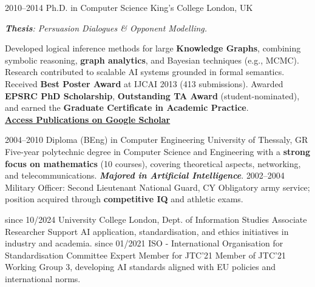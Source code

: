 \documentclass[]{../../friggeri-cv}
\begin{document}
\newpage
{}
\begin{entrylist2}
	\entrytwo
	    {\small 2010–2014}
	    {\small Ph.D. in Computer Science}
    	{\small King’s College London, UK}
	    {\small \emph{\textbf{Thesis}: Persuasion Dialogues \& Opponent Modelling.}
	    
	    	{\footnotesize Developed logical inference methods for large \textbf{Knowledge Graphs}, combining symbolic reasoning, \textbf{graph analytics}, and Bayesian techniques (e.g., MCMC). Research contributed to scalable AI systems grounded in formal semantics. Received \textbf{Best Poster Award} at IJCAI 2013 (413 submissions). Awarded \textbf{EPSRC PhD Scholarship}, \textbf{Outstanding TA Award} (student-nominated), and earned the \textbf{Graduate Certificate in Academic Practice}.
	    	\\ \textbf{\textcolor{blue}{\href{https://scholar.google.com/citations?hl=en&user=Rr3KTx8AAAAJ}{\underline{Access Publications on Google Scholar}}}}}
	    	}
	\entrytwo
		{\small  2004–2010}
		{\small Diploma (BEng) in Computer Engineering}
		{\small University of Thessaly, GR}
		{\footnotesize Five-year polytechnic degree in Computer Science and Engineering with a \textbf{strong focus on mathematics} (10 courses), covering theoretical aspects, networking, and telecommunications. \emph{\textbf{Majored in Artificial Intelligence}}.}
	\entrytwo
		{\small  2002–2004}
		{\small Military Officer: Second Lieutenant}
		{\small National Guard, CY}
		{\small Obligatory army service; position acquired through \textbf{competitive IQ} and athletic exams.}
\end{entrylist2}
\begin{entrylist2}
	\entrytwo
		{\footnotesize since 10/2024}
		{\small University College London, Dept. of Information Studies}
		{\small Associate Researcher}
		{\small Support AI application, standardisation, and ethics initiatives in industry and academia.}
	\entrytwo
		{\footnotesize since 01/2021}
		{\small ISO - International Organisation for Standardisation}
		{\small Committee Expert Member for JTC'21}
		{\footnotesize Member of JTC'21 Working Group 3, developing AI standards aligned with EU policies and international norms.}
\end{entrylist2}
\end{document}
